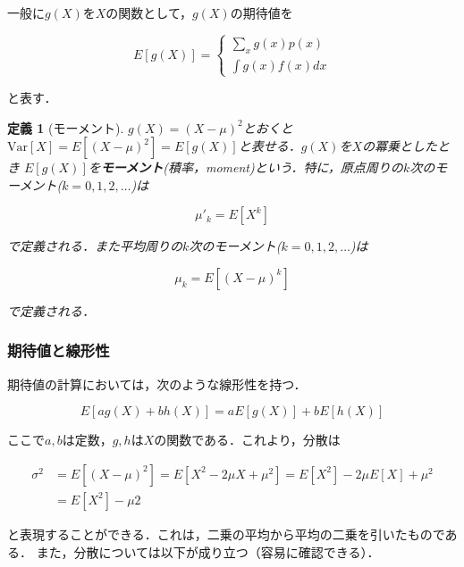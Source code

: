 \documentclass[12pt,a4j,draft]{jarticle}
\numberwithin{equation}{section}
\theoremstyle{break}
\newtheorem{definition}{定義}[section]
\newcommand{\V}{\text{Var}}
\begin{document}
一般に$g(X)$を$X$の関数として，$g(X)$の期待値を

\begin{equation}
    \label{eq:mean-of-gx}
    E[g(X)] = \begin{cases}
        \displaystyle \sum_x g(x) p(x) \\
        \displaystyle \int g(x) f(x) dx
    \end{cases}
\end{equation}

と表す．

\begin{definition}[モーメント]
    \label{def:moment}
$g(X) = (X - \mu)^2$とおくと$\V [X] = E[(X - \mu)^2] = E[g(X)]$と表せる．$g(X)$を$X$の冪乗としたとき $E[g(X)]$を\textbf{モーメント}(積率，\rm{moment})という．特に，原点周りの$k$次のモーメント($k=0,1,2,\ldots$)は

\begin{equation}
    \mu'_k = E[X^k]
\end{equation}

で定義される．また平均周りの$k$次のモーメント($k=0,1,2,\ldots$)は

\begin{equation}
    \mu_k = E[(X-\mu)^k]
\end{equation}

で定義される．
\end{definition}

\subsubsection{期待値と線形性}

期待値の計算においては，次のような線形性を持つ．

\begin{equation}
    E[ag(X) + bh(X)] = a E[g(X)] + b E[h(X)]
\end{equation}

ここで$a,b$は定数，$g,h$は$X$の関数である．これより，分散は

\begin{align}
    \sigma^2 &= E[(X - \mu)^2] = E[X^2 - 2 \mu X + \mu^2] = E[X^2] - 2\mu E[X] + \mu^2 \\
    &= E[X^2] - \mu 2
\label{eq:variance-expansion}
\end{align}

と表現することができる．これは，二乗の平均から平均の二乗を引いたものである．
また，分散については以下が成り立つ（容易に確認できる）．
\end{document}
